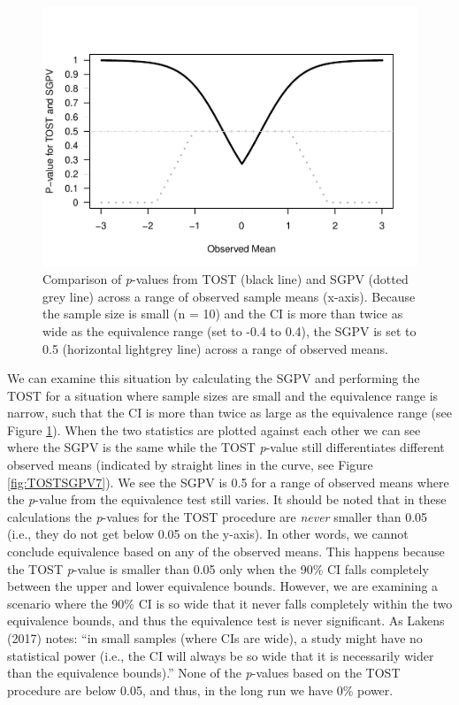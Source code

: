 \documentclass[,man,floatsintext]{apa6}
\begin{document}
\begin{figure}
\centering
\includegraphics{manuscript.R1_files/figure-latex/TOSTSGPV6-1.pdf}
\caption{\label{fig:TOSTSGPV6}Comparison of \emph{p}-values from TOST (black
line) and SGPV (dotted grey line) across a range of observed sample
means (x-axis). Because the sample size is small (n = 10) and the CI is
more than twice as wide as the equivalence range (set to -0.4 to 0.4),
the SGPV is set to 0.5 (horizontal lightgrey line) across a range of
observed means.}
\end{figure}

We can examine this situation by calculating the SGPV and performing the
TOST for a situation where sample sizes are small and the equivalence
range is narrow, such that the CI is more than twice as large as the
equivalence range (see Figure \ref{fig:TOSTSGPV6}). When the two
statistics are plotted against each other we can see where the SGPV is
the same while the TOST \emph{p}-value still differentiates different
observed means (indicated by straight lines in the curve, see Figure
\ref{fig:TOSTSGPV7}). We see the SGPV is 0.5 for a range of observed
means where the \emph{p}-value from the equivalence test still varies.
It should be noted that in these calculations the \emph{p}-values for
the TOST procedure are \emph{never} smaller than 0.05 (i.e., they do not
get below 0.05 on the y-axis). In other words, we cannot conclude
equivalence based on any of the observed means. This happens because the
TOST \emph{p}-value is smaller than 0.05 only when the 90\% CI falls
completely between the upper and lower equivalence bounds. However, we
are examining a scenario where the 90\% CI is so wide that it never
falls completely within the two equivalence bounds, and thus the
equivalence test is never significant. As Lakens (2017) notes:
\enquote{in small samples (where CIs are wide), a study might have no
statistical power (i.e., the CI will always be so wide that it is
necessarily wider than the equivalence bounds).} None of the
\emph{p}-values based on the TOST procedure are below 0.05, and thus, in
the long run we have 0\% power.
\end{document}
